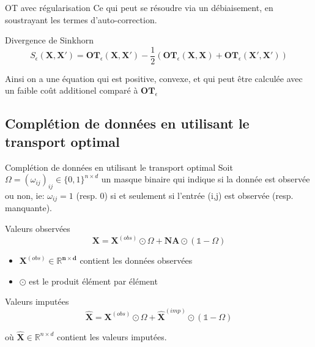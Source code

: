 \documentclass{beamer}
\begin{document}

\begin{frame}{OT avec régularisation}
    Ce qui peut se résoudre via un débiaisement, en soustrayant les termes d'auto-correction.
    \begin{block}{Divergence de Sinkhorn}
        $$S_{\epsilon}(\textbf{X}, \textbf{X}') = \textbf{OT}_{\epsilon}(\textbf{X},\textbf{X}') - \frac{1}{2}(\textbf{OT}_{\epsilon}(\textbf{X}, \textbf{X}) + \textbf{OT}_{\epsilon}(\textbf{X}', \textbf{X}'))$$
    \end{block}
    Ainsi on a une équation qui est positive, convexe, et qui peut être calculée avec un faible coût additionel comparé à $\textbf{OT}_{\epsilon}$
\end{frame}


\subsection{Complétion de données en utilisant le transport optimal}

\begin{frame}{Complétion de données en utilisant le transport optimal}
    Soit $\Omega = (\omega_{ij})_{ij} \in \{0,1\}^{n\times d}$ un masque binaire qui indique si la donnée est observée ou non, ie: $\omega_{ij} = 1$ (resp. 0) si et seulement si l'entrée (i,j) est observée (resp. manquante). 
    \begin{block}{Valeurs observées}
        $$\textbf{X}=\textbf{X}^{(\textit{obs})}\odot \Omega + \textbf{NA} \odot (\mathbf{\mathds{1}} - \Omega)$$
    \end{block}
    \begin{itemize}
        \item $\mathbf{\textbf{X}^{(\textit{obs})}\in \mathbb{R}^{n\times d}}$ contient les données observées
        \item $\mathbf{\odot}$ est le produit élément par élément
    \end{itemize}
    \begin{block}{Valeurs imputées}
        $$\hat{\textbf{X}}=\textbf{X}^{(\textit{obs})}\odot \Omega + \hat{\textbf{X}}^{(\textit{imp})}\odot (\mathbf{\mathds{1}} - \Omega)$$
    \end{block}
    où $\hat{\textbf{X}} \in \mathbb{R}^{n\times d}$ contient les valeurs imputées.
\end{frame}

\end{document}
